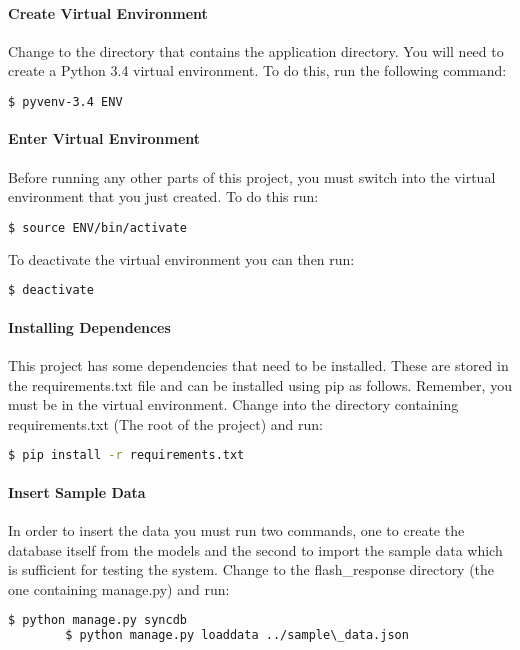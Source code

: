 \documentclass[10pt]{report}
\begin{document}
    \paragraph{Create Virtual Environment}
    Change to the directory that contains the application directory.  You will need to create a Python 3.4
    virtual environment.  To do this, run the following command:
    \begin{lstlisting}[language=bash]
    	$ pyvenv-3.4 ENV
    \end{lstlisting}
    
    \paragraph{Enter Virtual Environment}
    Before running any other parts of this project, you must switch into the virtual environment that you
    just created.  To do this run:
    \begin{lstlisting}[language=bash]
    	$ source ENV/bin/activate
    \end{lstlisting}
    To deactivate the virtual environment you can then run:
    \begin{lstlisting}[language=bash]
    	$ deactivate
    \end{lstlisting}
    
    \paragraph{Installing Dependences}
    This project has some dependencies that need to be installed.  These are stored in the 
    requirements.txt file and can be installed using pip as follows.  Remember, you must be in the virtual
    environment.  Change into the directory containing requirements.txt (The root of the project) and run:
    \begin{lstlisting}[language=bash]
    	$ pip install -r requirements.txt
    \end{lstlisting}
    
    \paragraph{Insert Sample Data}
    In order to insert the data you must run two commands, one to create the database itself from the
    models and the second to import the sample data which is sufficient for testing the system. Change to
    the flash\_response directory (the one containing manage.py) and run:
    \begin{lstlisting}[language=bash]
    	$ python manage.py syncdb
    	$ python manage.py loaddata ../sample\_data.json
    \end{lstlisting}
    
\end{document}
